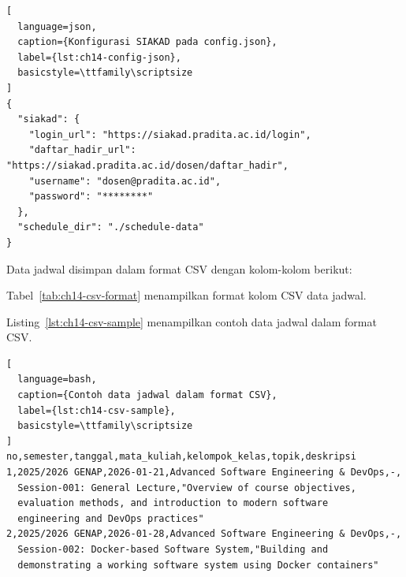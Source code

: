 \begin{lstlisting}[
  language=json,
  caption={Konfigurasi SIAKAD pada config.json},
  label={lst:ch14-config-json},
  basicstyle=\ttfamily\scriptsize
]
{
  "siakad": {
    "login_url": "https://siakad.pradita.ac.id/login",
    "daftar_hadir_url": "https://siakad.pradita.ac.id/dosen/daftar_hadir",
    "username": "dosen@pradita.ac.id",
    "password": "********"
  },
  "schedule_dir": "./schedule-data"
}
\end{lstlisting}

Data jadwal disimpan dalam format CSV dengan kolom-kolom berikut:


Tabel~\ref{tab:ch14-csv-format} menampilkan format kolom CSV data jadwal.
\begin{table}[h]
\centering
\caption{Format kolom CSV data jadwal}
\label{tab:ch14-csv-format}
\footnotesize
{}
\normalsize
\end{table}


Listing~\ref{lst:ch14-csv-sample} menampilkan contoh data jadwal dalam format CSV.
\begin{lstlisting}[
  language=bash,
  caption={Contoh data jadwal dalam format CSV},
  label={lst:ch14-csv-sample},
  basicstyle=\ttfamily\scriptsize
]
no,semester,tanggal,mata_kuliah,kelompok_kelas,topik,deskripsi
1,2025/2026 GENAP,2026-01-21,Advanced Software Engineering & DevOps,-,
  Session-001: General Lecture,"Overview of course objectives,
  evaluation methods, and introduction to modern software
  engineering and DevOps practices"
2,2025/2026 GENAP,2026-01-28,Advanced Software Engineering & DevOps,-,
  Session-002: Docker-based Software System,"Building and
  demonstrating a working software system using Docker containers"
\end{lstlisting}

